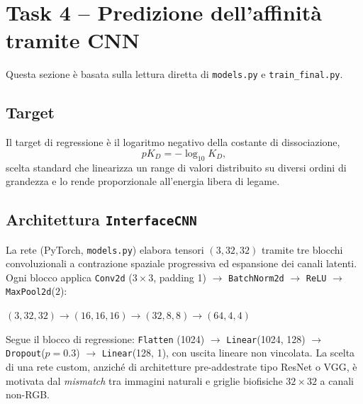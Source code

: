 \documentclass[11pt,a4paper]{article}
\begin{document}
\section{Task 4 -- Predizione dell'affinità tramite CNN}
\label{sec:task4}
 
Questa sezione è basata sulla lettura diretta di \texttt{models.py} e \texttt{train\_final.py}.
 
\subsection{Target}
Il target di regressione è il logaritmo negativo della costante di dissociazione,
\[
pK_D = -\log_{10} K_D ,
\]
scelta standard che linearizza un range di valori distribuito su diversi ordini di grandezza e lo rende proporzionale all'energia libera di legame.
 
\subsection{Architettura \texttt{InterfaceCNN}}
La rete (PyTorch, \texttt{models.py}) elabora tensori $(3,32,32)$ tramite tre blocchi convoluzionali a contrazione spaziale progressiva ed espansione dei canali latenti. Ogni blocco applica \texttt{Conv2d} ($3\times3$, padding 1) $\rightarrow$ \texttt{BatchNorm2d} $\rightarrow$ \texttt{ReLU} $\rightarrow$ \texttt{MaxPool2d}($2$):
\begin{center}
$(3,32,32) \rightarrow (16,16,16) \rightarrow (32,8,8) \rightarrow (64,4,4)$
\end{center}
Segue il blocco di regressione: \texttt{Flatten} (1024) $\rightarrow$ \texttt{Linear}(1024, 128) $\rightarrow$ \texttt{Dropout}($p=0.3$) $\rightarrow$ \texttt{Linear}(128, 1), con uscita lineare non vincolata. La scelta di una rete custom, anziché di architetture pre-addestrate tipo ResNet o VGG, è motivata dal \emph{mismatch} tra immagini naturali e griglie biofisiche $32\times32$ a canali non-RGB.
 
\end{document}
